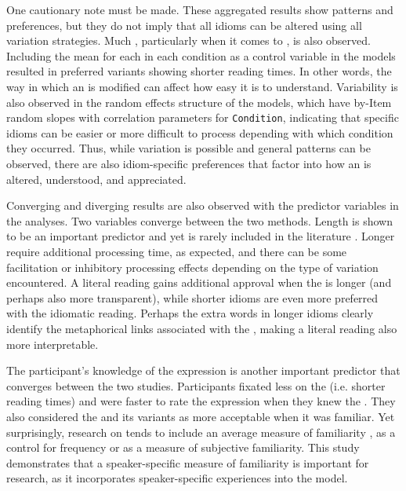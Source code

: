 \documentclass[output=paper
,modfonts
,nonflat]{langsci/langscibook}
\begin{document}
One cautionary note must be made. These aggregated results show patterns and preferences, but they do not imply that all idioms can be altered using all variation strategies. Much , particularly when it comes to , is also observed. Including the mean  for each  in each condition as a control variable in the  models resulted in preferred variants showing shorter reading times. In other words, the way in which an  is modified can affect how easy it is to understand. Variability is also observed in the random effects structure of the  models, which have by-Item random slopes with correlation parameters for \texttt{Condition}, indicating that specific idioms can be easier or more difficult to process depending with which condition they occurred. Thus, while variation  is possible and general patterns can be observed, there are also idiom-specific preferences that factor into how an  is altered, understood, and appreciated. 

   


Converging and diverging results  are also observed with the predictor variables in the analyses. Two variables converge between the two methods. Length is shown to be an important predictor and yet is rarely included in the  literature \citep[cf.][]{FanariEtAl2010}. Longer  require additional processing time, as expected, and there can be some facilitation or inhibitory processing effects depending on the type of variation encountered. A literal reading gains additional approval when the  is longer (and perhaps also more transparent), while shorter idioms are even more preferred with the idiomatic reading. Perhaps the extra words in longer idioms clearly identify the metaphorical links associated with the , making a literal reading  also more interpretable.

The participant's knowledge of the expression is another important predictor that converges between the two studies.  Participants fixated less on the  (i.e. shorter reading times) and were faster to rate the expression when they knew the . They also considered the  and its variants as more acceptable when it was familiar. Yet surprisingly, research on  tends to include an average measure of familiarity \citep[cf.][]{TitoneConnine1994}, as a control for frequency or as a measure of subjective familiarity. This study demonstrates that a speaker-specific measure of familiarity is important for  research, as it incorporates speaker-specific experiences into the model.
\end{document}
